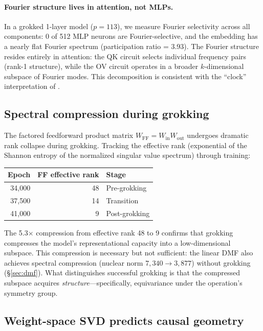 \documentclass{article}
\begin{document}
\paragraph{Fourier structure lives in attention, not MLPs.}
In a grokked 1-layer model ($p = 113$), we measure Fourier selectivity
across all components: 0 of 512 MLP neurons are Fourier-selective, and the
embedding has a nearly flat Fourier spectrum (participation ratio = 3.93).
The Fourier structure resides entirely in attention: the QK circuit selects
individual frequency pairs (rank-1 structure), while the OV circuit operates
in a broader $k$-dimensional subspace of Fourier modes. This decomposition
is consistent with the ``clock'' interpretation of \citet{zhong2024clock}.

\subsection{Spectral compression during grokking}
\label{sec:spectral_compression}

The factored feedforward product matrix $W_\text{FF} = W_\text{in} W_\text{out}$
undergoes dramatic rank collapse during grokking. Tracking the effective rank
(exponential of the Shannon entropy of the normalized singular value spectrum)
through training:

\begin{center}
\small
\begin{tabular}{rrl}
\toprule
Epoch & FF effective rank & Stage \\
\midrule
34{,}000 & 48 & Pre-grokking \\
37{,}500 & 14 & Transition \\
41{,}000 & 9 & Post-grokking \\
\bottomrule
\end{tabular}
\end{center}

The 5.3$\times$ compression from effective rank 48 to 9 confirms that
grokking compresses the model's representational capacity into a
low-dimensional subspace. This compression is necessary but not sufficient:
the linear DMF also achieves spectral compression (nuclear norm
$7{,}340 \to 3{,}877$) without grokking (\S\ref{sec:dmf}). What distinguishes
successful grokking is that the compressed subspace acquires
\emph{structure}---specifically, equivariance under the operation's symmetry
group.

\subsection{Weight-space SVD predicts causal geometry}
\label{sec:svd_vs_das}
\end{document}
